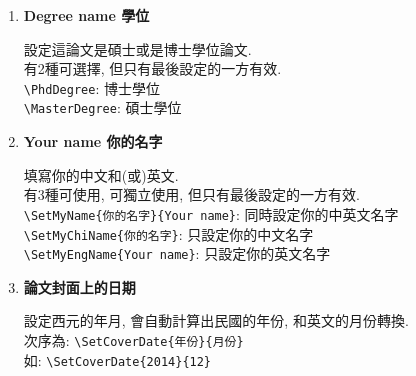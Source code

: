 \begin{enumerate}
{    有3種可使用, 可獨立使用, 但只有最後設定的一方有效\\
    \verb|\SetTitle{你的題目}{Your Title}|: 同時設定中英文題目\\
    \verb|\SetChiTitle{你的題目}|: 只設定中文題目\\
    \verb|\SetEngTitle{Your Title}|: 只設定英文題目\\

    如:\\
    \verb|\SetTitle %|\\
    \verb|{中文題目中文題目} %|\\
    \verb|{Your Title Your Title}|\\
    \verb|'%'|是必須的, 是用來跟Latex說這3行是同一句話.

    或\\
    \verb|\SetChiTitle{中文題目中文題目}|\\
    \verb|\SetEngTitle{Your Title \\ Your Title}|

    圖書館說不管你是編寫中英混合或全英文版, 都\textbf{必須}同時存在中英題目.
  } %

  \item
  {
    \textbf{Degree name 學位}

    設定這論文是碩士或是博士學位論文.\\
    有2種可選擇, 但只有最後設定的一方有效.\\
    \verb|\PhdDegree|: 博士學位\\
    \verb|\MasterDegree|: 碩士學位
  } %

  \item
  {
    \textbf{Your name 你的名字}

    填寫你的中文和(或)英文.\\
    有3種可使用, 可獨立使用, 但只有最後設定的一方有效.\\
    \verb|\SetMyName{你的名字}{Your name}|: 同時設定你的中英文名字\\
    \verb|\SetMyChiName{你的名字}|: 只設定你的中文名字\\
    \verb|\SetMyEngName{Your name}|: 只設定你的英文名字
  } %

  \item
  {
    \textbf{論文封面上的日期}

    設定西元的年月, 會自動計算出民國的年份, 和英文的月份轉換.\\
    次序為: \verb|\SetCoverDate{年份}{月份}|\\
    如: \verb|\SetCoverDate{2014}{12}|

}
\end{enumerate}
